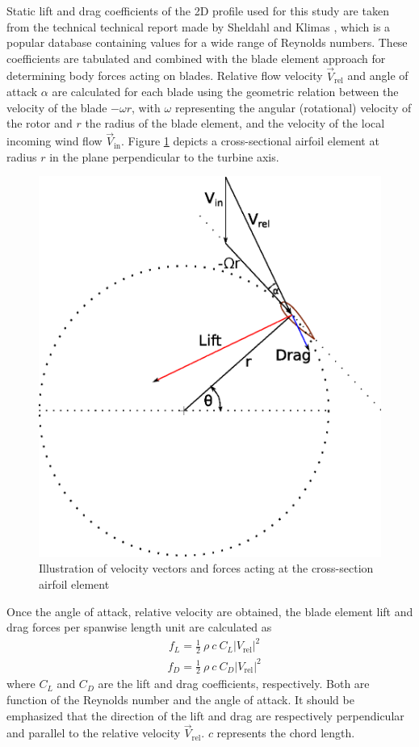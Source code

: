 \documentclass[a4paper]{jpconf}
\begin{document}
Static lift and drag coefficients of the 2D profile used for this study are
taken from the technical technical report made by Sheldahl and Klimas
\cite{sheldahl1981aerodynamic}, which is a popular database containing values
for a wide range of Reynolds numbers. These coefficients are tabulated and
combined with the blade element approach for determining body forces acting on
blades. Relative flow velocity $\vec{V}_{\mathrm{rel}}$ and angle of attack
$\alpha$ are calculated for each blade using the geometric relation between the
velocity of the blade $- \omega r$, with $\omega$ representing the angular
(rotational) velocity of the rotor and $r$ the radius of the blade element, and
the velocity of the local incoming wind flow $\vec{V}_{\mathrm{in}}$. Figure
\ref{figvectors} depicts a cross-sectional airfoil element at radius $r$ in the
plane perpendicular to the turbine axis.

\begin{figure}[h]
\begin{center}
\includegraphics[width=0.35\columnwidth]{vector.eps}
\end{center}
\caption{\label{figvectors} Illustration of velocity vectors and forces acting at the cross-section airfoil element}
\end{figure}

Once the angle of attack, relative velocity are obtained, the blade element lift and drag forces per spanwise length unit are calculated as
\begin{align}
& f_L = \frac{1}{2} \ \rho \ c \ C_L \left| V_{\mathrm{rel}} \right|^2  \label{lift}
\end{align} %
\begin{align}
& f_D = \frac{1}{2} \ \rho \ c \ C_D \left| V_{\mathrm{rel}} \right|^2  \label{drag}
\end{align} %
where $C_L$ and $C_D$ are the lift and drag coefficients, respectively. Both are
function of the Reynolds number and the angle of attack. It should be emphasized
that the direction of the lift and drag are respectively perpendicular and
parallel to the relative velocity $\vec{V}_{\mathrm{rel}}$. $c$ represents the
chord length.
\end{document}
